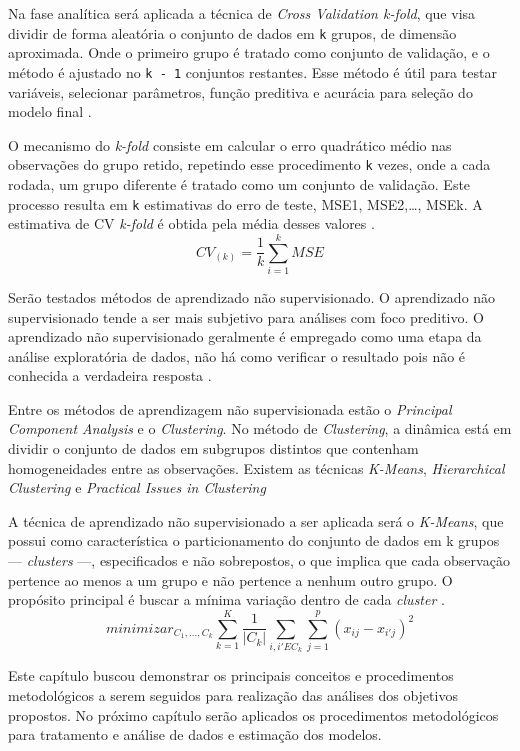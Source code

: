 \documentclass[12pt,12pt,openright,oneside,a4paper,chapter=TITLE,section=TITLE,subsection=TITLE,subsubsection=TITLE,english,french,spanish,portugues,sumario=tradicional]{abntex2}
\begin{document}
Na fase analítica será aplicada a técnica de \emph{Cross Validation k-fold}, que visa dividir de forma aleatória o conjunto de dados em \texttt{k} grupos, de dimensão aproximada. Onde o primeiro grupo é tratado como conjunto de validação, e o método é ajustado no \texttt{k\ -\ 1} conjuntos restantes. Esse método é útil para testar variáveis, selecionar parâmetros, função preditiva e acurácia para seleção do modelo final \cite{gareth:2017}.

O mecanismo do \emph{k-fold} consiste em calcular o erro quadrático médio nas observações do grupo retido, repetindo esse procedimento \texttt{k} vezes, onde a cada rodada, um grupo diferente é tratado como um conjunto de validação. Este processo resulta em \texttt{k} estimativas do erro de teste, MSE1, MSE2,\ldots{}, MSEk. A estimativa de CV \emph{k-fold} é obtida pela média desses valores \cite{gareth:2017}.
\[
CV_{(k)} = \frac{1}{k}\sum_{i=1}^{k}MSE  
\]

Serão testados métodos de aprendizado não supervisionado. O aprendizado não supervisionado tende a ser mais subjetivo para análises com foco preditivo. O aprendizado não supervisionado geralmente é empregado como uma etapa da análise exploratória de dados, não há como verificar o resultado pois não é conhecida a verdadeira resposta \cite{gareth:2017}.

Entre os métodos de aprendizagem não supervisionada estão o \emph{Principal Component Analysis} e o \emph{Clustering}. No método de \emph{Clustering}, a dinâmica está em dividir o conjunto de dados em subgrupos distintos que contenham homogeneidades entre as observações. Existem as técnicas \emph{K-Means}, \emph{Hierarchical Clustering} e \emph{Practical Issues in Clustering} \cite{gareth:2017}

A técnica de aprendizado não supervisionado a ser aplicada será o \emph{K-Means}, que possui como característica o particionamento do conjunto de dados em k grupos --- \emph{clusters} ---, especificados e não sobrepostos, o que implica que cada observação pertence ao menos a um grupo e não pertence a nenhum outro grupo. O propósito principal é buscar a mínima variação dentro de cada \emph{cluster} \cite{gareth:2017}.
\[
minimizar_{C_1,...,C_k} \sum_{k = 1}^{K}\frac{1}{|C_k|}\sum_{i,i' E C_k} \sum_{j=1}^{p}(x_{ij} - x_{i'j})^2 
\]

Este capítulo buscou demonstrar os principais conceitos e procedimentos metodológicos a serem seguidos para realização das análises dos objetivos propostos. No próximo capítulo serão aplicados os procedimentos metodológicos para tratamento e análise de dados e estimação dos modelos.
\end{document}

